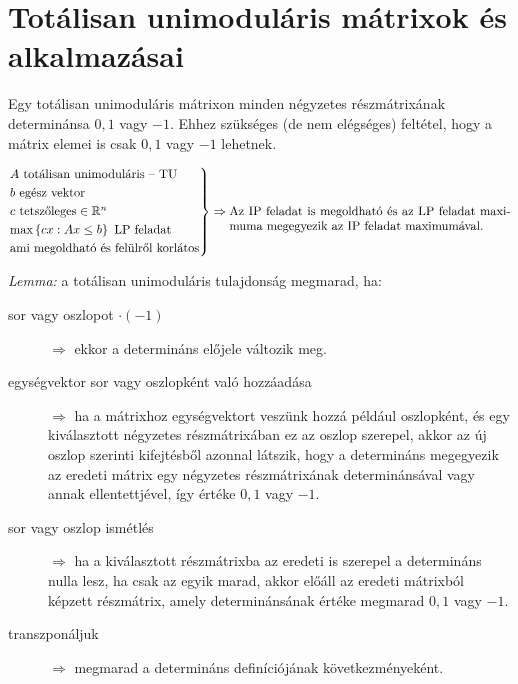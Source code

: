 \skiptooddpage%
\section{Totálisan unimoduláris mátrixok és alkalmazásai}

Egy totálisan unimoduláris mátrixon minden négyzetes részmátrixának determinánsa
$0, 1$ vagy $-1$. Ehhez szükséges (de nem elégséges) feltétel, hogy a mátrix
elemei is csak $0, 1$ vagy $-1$ lehetnek.

\[
	\begin{rcases}
		A \text{ totálisan unimoduláris -- TU}                      \\
		b \text{ egész vektor}                                      \\
		c \text{ tetszőleges} \in \mathbb{R}^n                      \\
		\text{max} \left\{ cx:Ax \leq b \right\} \text{ LP feladat} \\
		\text{ami megoldható és felülről korlátos}
	\end{rcases} \Rightarrow \parbox[t]{8cm}{ Az IP feladat is megoldható és az LP
		feladat maximuma megegyezik az IP feladat maximumával.} \]

\emph{Lemma:} a totálisan unimoduláris tulajdonság megmarad, ha:

\begin{description}
	\item[sor vagy oszlopot $\cdot (-1)$] $\Rightarrow$ ekkor a determináns
	      előjele változik meg.
	\item[egységvektor sor vagy oszlopként való hozzáadása] $\Rightarrow$ ha a
	      mátrixhoz egységvektort veszünk hozzá például oszlopként, és egy kiválasztott
	      négyzetes részmátrixában ez az oszlop szerepel, akkor az új oszlop szerinti
	      kifejtésből azonnal látszik, hogy a determináns megegyezik az eredeti mátrix
	      egy négyzetes részmátrixának determinánsával vagy annak ellentettjével, így
	      értéke $0, 1$ vagy $-1$.
	\item[sor vagy oszlop ismétlés] $\Rightarrow$ ha a kiválasztott részmátrixba
	      az eredeti is szerepel a determináns nulla lesz, ha csak az egyik marad, akkor
	      előáll az eredeti mátrixból képzett részmátrix, amely determinánsának értéke
	      megmarad $0, 1$ vagy $-1$.
	\item[transzponáljuk] $\Rightarrow$ megmarad a determináns definíciójának
	      következményeként.
\end{description}

